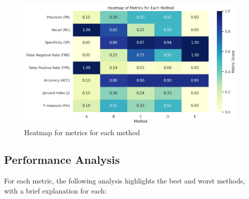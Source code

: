 \documentclass{article}
\begin{document}
\begin{figure}[H]
	\centering
	\includegraphics[width=\textwidth]{images/heatmap.png}
	\caption{Heatmap for metrics for each method}
	\label{fig:heatmap}
\end{figure}


\subsection{Performance Analysis}

For each metric, the following analysis highlights the best and worst methods, with a brief explanation for each:
\end{document}
